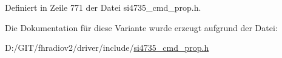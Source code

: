Definiert in Zeile 771 der Datei si4735\+\_\+cmd\+\_\+prop.\+h.



Die Dokumentation für diese Variante wurde erzeugt aufgrund der Datei\+:\begin{DoxyCompactItemize}
\item 
D\+:/\+G\+I\+T/fhradiov2/driver/include/\hyperlink{si4735__cmd__prop_8h}{si4735\+\_\+cmd\+\_\+prop.\+h}\end{DoxyCompactItemize}
